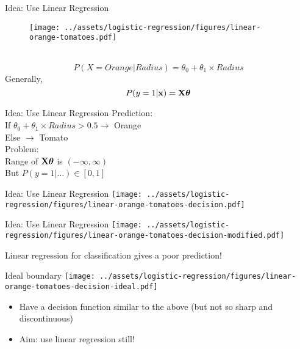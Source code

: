 \documentclass{beamer}
\begin{document}
\begin{frame}{Idea: Use Linear Regression}
\hspace{2.5cm}
\begin{minipage}{0.3\textwidth}
	
	\begin{figure}
		
		\texttt{[image: ../assets/logistic-regression/figures/linear-orange-tomatoes.pdf]}
	\end{figure}
\end{minipage} \\
\begin{equation*}
P(X = Orange | Radius) = \theta_{0} + \theta_{1} \times Radius
\end{equation*}
\pause Generally,
\begin{equation*}
P(y = 1 | \mathbf{x}) = \mathbf{X}\boldsymbol{\theta}
\end{equation*}
\end{frame}
\begin{frame}{Idea: Use Linear Regression}
Prediction:\\
If $\theta_{0} + \theta_{1}\times Radius > 0.5 \rightarrow$ Orange \\
\hspace{3.3cm} Else $\rightarrow$ Tomato\\
Problem:\\
Range of $\mathbf{X}\boldsymbol{\theta}$ is $(-\infty, \infty)$\\
But $P(y = 1 | \ldots) \in [0, 1]$
\end{frame}

\begin{frame}{Idea: Use Linear Regression}
\texttt{[image: ../assets/logistic-regression/figures/linear-orange-tomatoes-decision.pdf]}
\end{frame}

\begin{frame}{Idea: Use Linear Regression}
\texttt{[image: ../assets/logistic-regression/figures/linear-orange-tomatoes-decision-modified.pdf]}


Linear regression for classification gives a poor prediction!
\end{frame}

\begin{frame}{Ideal boundary}
\texttt{[image: ../assets/logistic-regression/figures/linear-orange-tomatoes-decision-ideal.pdf]}

\begin{itemize}[<+->]
	\item Have a decision function similar to the above (but not so sharp and discontinuous)
	\item Aim: use linear regression still!
\end{itemize}
\end{frame}
\end{document}
